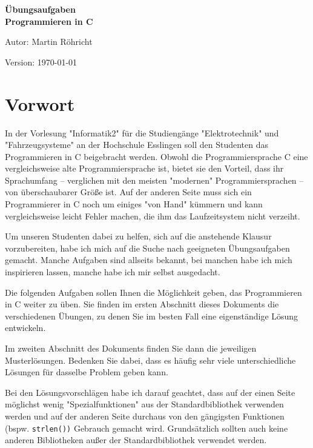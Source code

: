 \documentclass{coding-exercises}
\begin{document}
\begin{titlepage}
  \centering

  {\fontsize{40}{48}\bfseries\sffamily Übungsaufgaben\\Programmieren in C\par}

  {\Large Autor: Martin Röhricht}

  \vfill
  Version: \today
\end{titlepage}


\frontmatter
\chapter{Vorwort}

In der Vorlesung "Informatik2" für die Studiengänge "Elektrotechnik" und
"Fahrzeugsysteme" an der Hochschule Esslingen soll den Studenten das
Programmieren in C beigebracht werden. Obwohl die Programmiersprache C eine
vergleichsweise alte Programmiersprache ist, bietet sie den Vorteil, dass ihr
Sprachumfang -- verglichen mit den meisten "modernen" Programmiersprachen --
von überschaubarer Größe ist. Auf der anderen Seite muss sich ein Programmierer
in C noch um einiges "von Hand" kümmern und kann vergleichsweise leicht Fehler
machen, die ihm das Laufzeitsystem nicht verzeiht.

Um unseren Studenten dabei zu helfen, sich auf die anstehende Klausur
vorzubereiten, habe ich mich auf die Suche nach geeigneten Übungsaufgaben
gemacht. Manche Aufgaben sind allseits bekannt, bei manchen habe ich mich
inspirieren lassen, manche habe ich mir selbst ausgedacht.

Die folgenden Aufgaben sollen Ihnen die Möglichkeit geben, das Programmieren in
C weiter zu üben. Sie finden im ersten Abschnitt dieses Dokuments die
verschiedenen Übungen, zu denen Sie im besten Fall eine eigenständige Lösung
entwickeln.

Im zweiten Abschnitt des Dokuments finden Sie dann die jeweiligen
Musterlösungen. Bedenken Sie dabei, dass es häufig sehr viele unterschiedliche
Lösungen für dasselbe Problem geben kann.

Bei den Lösungsvorschlägen habe ich darauf geachtet, dass auf der einen Seite
möglichst wenig "Spezialfunktionen" aus der Standardbibliothek verwenden werden
und auf der anderen Seite durchaus von den gängigsten Funktionen (bspw.
\texttt{strlen())} Gebrauch gemacht wird. Grundsätzlich sollten auch
keine anderen Bibliotheken außer der Standardbibliothek verwendet werden.
\end{document}
